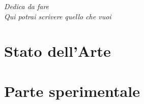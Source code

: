 \documentclass[12pt,a4paper,openright,twoside]{report}
\begin{document}
\begin{titlepage}

\thispagestyle{empty}
\topmargin=6.5cm
\raggedleft
\large

\em
Dedica da fare\\
Qui potrai scrivere quello che vuoi\\
\newpage

\end{titlepage}



\clearpage{\pagestyle{empty}\cleardoublepage}


\tableofcontents
\rhead[\fancyplain{}{\bfseries\leftmark}]{\fancyplain{}{\bfseries\thepage}}


\clearpage{\pagestyle{empty}\cleardoublepage}
\listoffigures


\clearpage{\pagestyle{empty}\cleardoublepage}
\listoftables


\clearpage{\pagestyle{empty}\cleardoublepage}
\lstlistoflistings


\clearpage{\pagestyle{empty}\cleardoublepage}
\lhead[\fancyplain{}{\bfseries\thepage}]{\fancyplain{}{\bfseries\rightmark}}

\part{Stato dell'Arte}


\part{Parte sperimentale}



\end{document}
